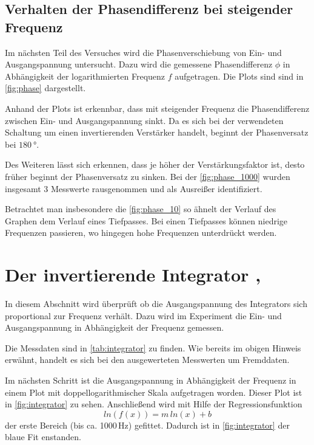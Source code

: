\subsection{Verhalten der Phasendifferenz bei steigender Frequenz}
Im nächsten Teil des Versuches wird die Phasenverschiebung von Ein- und Ausgangspannung 
untersucht.
Dazu wird die gemessene Phasendifferenz $\phi$ in Abhängigkeit der logarithmierten Frequenz $f$
aufgetragen.
Die Plots sind sind in \autoref{fig:phase} dargestellt.

Anhand der Plots ist erkennbar, dass mit steigender Frequenz die Phasendifferenz zwischen 
Ein- und Ausgangspannung sinkt.
Da es sich bei der verwendeten Schaltung um einen invertierenden Verstärker handelt, beginnt 
der Phasenversatz bei $\SI{180}{\degree}$.

Des Weiteren lässt sich erkennen, dass je höher der Verstärkungsfaktor ist, desto früher
beginnt der Phasenversatz zu sinken. 
Bei der \autoref{fig:phase_1000} wurden insgesamt 3 Messwerte rausgenommen und 
als Ausreißer identifiziert.

Betrachtet man insbesondere die \autoref{fig:phase_10} so ähnelt der Verlauf
des Graphen dem Verlauf eines Tiefpasses.
Bei einen Tiefpasses können niedrige Frequenzen passieren, wo hingegen hohe Frequenzen
unterdrückt werden.

\section{Der invertierende Integrator \cite{int_data}, \cite{int_picture}}
In diesem Abschnitt wird überprüft ob die Ausgangspannung des Integrators sich proportional 
zur Frequenz verhält.
Dazu wird im Experiment die Ein- und Ausgangspannung in Abhängigkeit der Frequenz gemessen.

Die Messdaten sind in \autoref{tab:integrator} zu finden. 
Wie bereits im obigen Hinweis erwähnt, handelt es sich bei den ausgewerteten Messwerten
um Fremddaten.

Im nächsten Schritt ist die Ausgangspannung in Abhängigkeit der Frequenz in einem Plot
mit doppellogarithmischer Skala aufgetragen worden.
Dieser Plot ist in \autoref{fig:integrator} zu sehen.
Anschließend wird mit Hilfe der Regressionsfunktion
\begin{equation*}
    ln(f(x)) =  m\,ln(x) + b
\end{equation*}
der erste Bereich (bis ca. 1000\,Hz) gefittet.
Dadurch ist in \autoref{fig:integrator} der blaue Fit enstanden.

